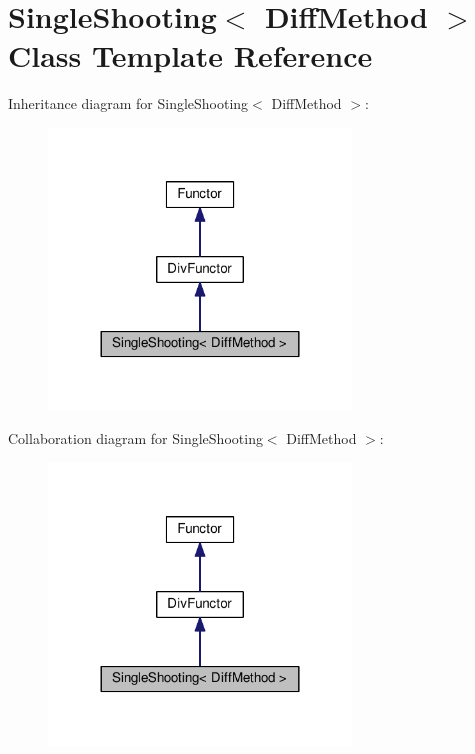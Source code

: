 \hypertarget{classSingleShooting}{}\section{Single\+Shooting$<$ Diff\+Method $>$ Class Template Reference}
\label{classSingleShooting}


Inheritance diagram for Single\+Shooting$<$ Diff\+Method $>$\+:
\nopagebreak
\begin{figure}[H]
\begin{center}
\leavevmode
\includegraphics[width=228pt]{classSingleShooting__inherit__graph}
\end{center}
\end{figure}


Collaboration diagram for Single\+Shooting$<$ Diff\+Method $>$\+:
\nopagebreak
\begin{figure}[H]
\begin{center}
\leavevmode
\includegraphics[width=228pt]{classSingleShooting__coll__graph}
\end{center}
\end{figure}
